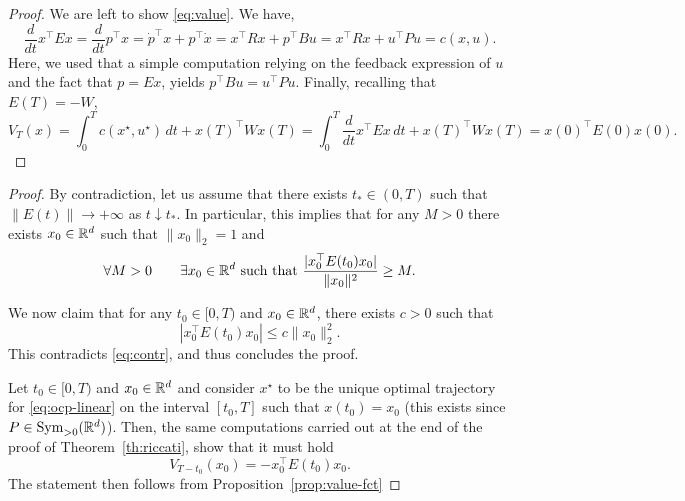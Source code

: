 \begin{proof}
    We are left to show \eqref{eq:value}. 
    We have,
    \begin{equation}
        \frac{d}{dt} x^\top E x 
        =\frac{d}{dt} p^\top x 
        = {\dot p}^\top x + p^\top \dot x
        = x^\top R x + p^\top B u
        = x^\top R x + u^\top P u = c(x,u).
    \end{equation}
    Here, we used that a simple computation relying on the feedback expression of $u$ and the fact that $p=Ex$, yields $p^\top B u = u^\top Pu$.
    Finally, recalling that $E(T)=-W$,
    \begin{equation}
        V_T(x) =  \int_0^T c(x^\star,u^\star)\, dt + x(T)^\top W x(T) = \int_0^T \frac{d}{dt} x^\top E x\, dt+ x(T)^\top W x(T) = x(0)^\top E(0) x(0).
    \end{equation}
\end{proof}


\begin{proof}
    By contradiction, let us assume that there exists $t_*\in (0,T)$ such that $\|E(t)\|\rightarrow +\infty$ as $t\downarrow t_*$. In particular, this implies that for any $M>0$ there exists $x_0\in \mathbb{R}^d$ such that $\|x_0\|_2=1$ and 
    \begin{equation}
        \forall M>0 \qquad \exists x_0\in \mathbb{R}^d  \text{ such that } \frac{|x_0^\top E(t_0)x_0|}{\|x_0\|^2}\ge M.
    \end{equation}

    We now claim that for any $t_0\in [0,T)$ and $x_0\in \mathbb{R}^d$, there exists $c>0$ such that 
    \begin{equation}
        |x_0^\top E(t_0)x_0|\le c \|x_0\|_2^2.
    \end{equation}
    This contradicts \eqref{eq:contr}, and thus concludes the proof.
    
    Let $t_0\in [0,T)$ and $x_0\in \mathbb{R}^d$ and consider $x^\star$ to be the unique optimal trajectory for \eqref{eq:ocp-linear} on the interval $[t_0,T]$ such that $x(t_0)=x_0$ (this exists since $P\in \operatorname{Sym}_{>0}(\mathbb{R}^d)$). Then, the same computations carried out at the end of the proof of Theorem~\ref{th:riccati}, show that it must hold 
    \begin{equation}
        V_{T-t_0}(x_0)=-x_0^\top E(t_0)x_0.
    \end{equation}
    The statement then follows from Proposition~\ref{prop:value-fct}
\end{proof}


